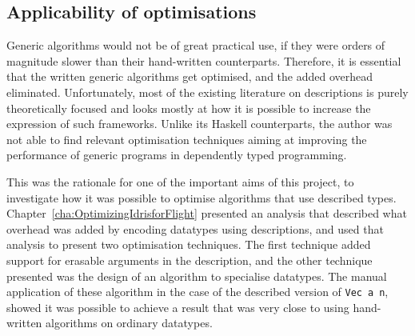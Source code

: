 \documentclass{ituthesis}
\newcommand{\tttype}[1]{\textcolor{type-color}{\texttt{#1}}}
\newcommand{\ttvar}[1]{\textcolor{local-var-color}{\texttt{#1}}}
\theoremstyle{break}
\begin{document}


\subsection{Applicability of optimisations}
\label{sub:Applicabilityofoptimisations}
Generic algorithms would not be of great practical use, if they were orders of magnitude slower than their hand-written counterparts.
Therefore, it is essential that the written generic algorithms get optimised, and the added overhead eliminated.
Unfortunately, most of the existing literature on descriptions is purely theoretically focused and looks mostly at how it is possible to increase the expression of such frameworks.
Unlike its Haskell counterparts, the author was not able to find relevant optimisation techniques aiming at improving the performance of generic programs in dependently typed programming.

This was the rationale for one of the important aims of this project, to investigate how it was possible to optimise algorithms that use described types.
Chapter~\ref{cha:OptimizingIdrisforFlight} presented an analysis that described what overhead was added by encoding datatypes using descriptions, and used that analysis to present two optimisation techniques.
The first technique added support for erasable arguments in the description, and the other technique presented was the design of an algorithm to specialise datatypes.
The manual application of these algorithm in the case of the described version of \tttype{Vec}~\ttvar{a}~\ttvar{n}, showed it was possible to achieve a result that was very close to using hand-written algorithms on ordinary datatypes.
\end{document}
